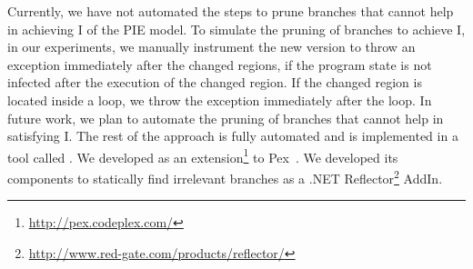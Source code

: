 Currently, we have not automated the steps to prune branches that cannot help in achieving I of the PIE model. To simulate the pruning of branches to achieve I, in our experiments, we manually instrument the new version to throw an exception immediately  after the changed regions, if the program state is not infected after the execution of the changed region. If the changed region is located inside a loop, we throw the exception immediately after the loop.
In future work, we plan to automate the pruning of branches that cannot help in satisfying I. 
The rest of the approach is fully automated and is implemented in a tool called . We developed  as an extension\footnote{\url{http://pex.codeplex.com/}} to Pex~\cite{Pex}. We developed its components to statically find irrelevant branches as a .NET Reflector\footnote{\url{http://www.red-gate.com/products/reflector/}} AddIn.


